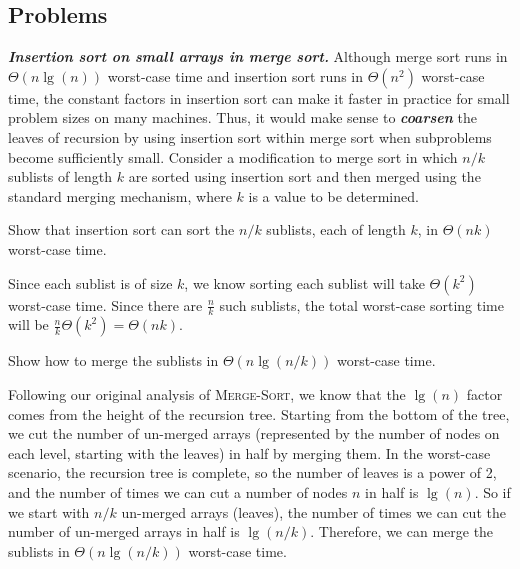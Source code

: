 \documentclass[Chapter02]{subfiles}
\begin{document}
	\subsection*{Problems}

	\begin{problems}
		\item \textbf{\textit{Insertion sort on small arrays in merge sort.}} Although merge sort runs in $\Theta(n \lg(n))$ worst-case time and insertion sort runs in $\Theta(n^2)$ worst-case time, the constant factors in insertion sort can make it faster in practice for small problem sizes on many machines. Thus, it would make sense to \textbf{\textit{coarsen}} the leaves of recursion by using insertion sort within merge sort when subproblems become sufficiently small. Consider a modification to merge sort in which $n / k$ sublists of length $k$ are sorted using insertion sort and then merged using the standard merging mechanism, where $k$ is a value to be determined.
		\begin{problems}
			\item Show that insertion sort can sort the $n / k$ sublists, each of length $k$, in $\Theta(nk)$ worst-case time.
			\begin{answer}
				Since each sublist is of size $k$, we know sorting each sublist will take $\Theta(k^2)$ worst-case time. Since there are $\frac{n}{k}$ such sublists, the total worst-case sorting time will be $\frac{n}{k} \Theta(k^2) = \Theta(nk)$.
			\end{answer}

			\item Show how to merge the sublists in $\Theta(n \lg(n / k))$ worst-case time.
			\begin{answer}
				Following our original analysis of \textsc{Merge-Sort}, we know that the $\lg(n)$ factor comes from the height of the recursion tree. Starting from the bottom of the tree, we cut the number of un-merged arrays (represented by the number of nodes on each level, starting with the leaves) in half by merging them. In the worst-case scenario, the recursion tree is complete, so the number of leaves is a power of 2, and the number of times we can cut a number of nodes $n$ in half is $\lg(n)$. So if we start with $n / k$ un-merged arrays (leaves), the number of times we can cut the number of un-merged arrays in half is $\lg(n / k)$. Therefore, we can merge the sublists in $\Theta(n \lg(n / k))$ worst-case time.
			\end{answer}
			

\end{problems}
\end{problems}
\end{document}
